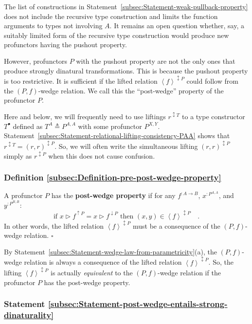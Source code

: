 The list of constructions in Statement~\ref{subsec:Statement-weak-pullback-property}
does not include the recursive type construction and limits the function
arguments to types not involving $A$. It remains an open question
whether, say, a suitably limited form of the recursive type construction
would produce new profunctors having the pushout property.

However, profunctors $P$ with the pushout property are not the only
ones that produce strongly dinatural transformations. This is because
the pushout property is too restrictive. It is sufficient if the lifted
relation $\left<f\right>^{\updownarrow P}$ could follow from the
$\left(P,f\right)$-wedge relation. We call this the \textsf{``}post-wedge\textsf{''}
property of the profunctor
$P$.

Here and below, we will frequently need to use liftings $r^{\updownarrow T}$
to a type constructor $T^{\bullet}$ defined as $T^{A}\triangleq P^{A,A}$
with some profunctor $P^{X,Y}$. Statement~\ref{subsec:Statement-relational-lifting-consistency-PAA}
shows that $r^{\updownarrow T}=(r,r)^{\updownarrow P}$. So, we will
often write the simultaneous lifting $(r,r)^{\updownarrow P}$ simply
as $r^{\updownarrow P}$ when this does not cause confusion.

\subsubsection{Definition \label{subsec:Definition-pre-post-wedge-property}\ref{subsec:Definition-pre-post-wedge-property}}

A profunctor $P$ has the \textbf{post-wedge property} if for any
$f^{:A\rightarrow B}$, $x^{:P^{A,A}}$, and $y^{:P^{B,B}}$:
\[
\text{if }x\triangleright f^{\uparrow P}=x\triangleright f^{\downarrow P}\text{ then }(x,y)\in\left<f\right>^{\updownarrow P}\quad.
\]
In other words, the lifted relation $\left<f\right>^{\updownarrow P}$
must be a consequence of the $\left(P,f\right)$-wedge relation. $\square$

By Statement~\ref{subsec:Statement-wedge-law-from-parametricity}(a),
the $\left(P,f\right)$-wedge relation is always a consequence of
the lifted relation $\left<f\right>^{\updownarrow P}$. So, the lifting
$\left<f\right>^{\updownarrow P}$ is actually \emph{equivalent} to
the $\left(P,f\right)$-wedge relation if the profunctor $P$ has
the post-wedge property.

\subsubsection{Statement \label{subsec:Statement-post-wedge-entails-strong-dinaturality}\ref{subsec:Statement-post-wedge-entails-strong-dinaturality}}

